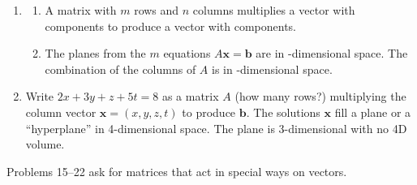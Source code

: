 \documentclass[14pt, a4paper]{article}
\begin{document}
\begin{enumerate}[resume]
    \item
          \begin{enumerate}
              \item[(a)] A matrix with $m$ rows and $n$ columns multiplies a vector with \underline{\hspace{2cm}} components to produce a vector with \underline{\hspace{2cm}} components.
              \item[(b)] The planes from the $m$ equations $A\boldsymbol{x} = \boldsymbol{b}$ are in \underline{\hspace{2cm}}-dimensional space. The combination of the columns of $A$ is in \underline{\hspace{2cm}}-dimensional space.
          \end{enumerate}

    \item Write $2x + 3y + z + 5t = 8$ as a matrix $A$ (how many rows?) multiplying the column vector $\boldsymbol{x} = (x, y, z, t)$ to produce $\boldsymbol{b}$. The solutions $\boldsymbol{x}$ fill a plane or a ``hyperplane'' in 4-dimensional space. The plane is 3-dimensional with no 4D volume.
\end{enumerate}

\noindent Problems 15--22 ask for matrices that act in special ways on vectors.
\end{document}
